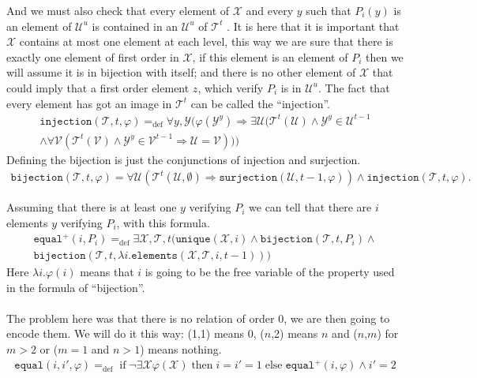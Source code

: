 \documentclass[a4paper,12pt]{article}
\theoremstyle{definition}
\renewcommand{\phi}{\varphi}
\DeclareMathOperator{\ifte}{if}
\DeclareMathOperator{\thent}{then}
\DeclareMathOperator{\elset}{else}
\newcommand{\mc}{\mathcal}
\newcommand{\ed}{=_{\mathrm{def}}}
\begin{document}
And we must also check that every element of $\mc X$ and every $y$
such that $P_i(y)$ is an element of $\mc U^u$ is contained in an $\mc
U^u$ of $\mc T^t$ . It is here that it is important that $\mc X$
contains at most one element at each level, this way we are sure that
there is exactly one element of first order in $\mc X$, if this
element is an element of $P_i$ then we will assume it is in bijection
with itself; and there is no other element of $\mc X$ that could imply
that a first order element $z$, which verify $P_i$ is in $\mc
U^{u}$. The fact that every element has got an image in $\mc T^{t}$
can be called the ``injection''.
\begin{eqnarray}
  \label{eq:relat-total}
  \texttt{injection}(\mc T,t,\phi)\ed \forall y,\mc Y(\phi(\mc Y^y)\Rightarrow\exists \mc U(\mc T^t(\mc U)\land\mc Y^{y}\in \mc U^{t-1}\nonumber \\ \land \forall \mc V(\mc T^t(\mc V)\land \mc Y^{y}\in  \mc V^{t-1}\Rightarrow \mc{U=V})))
\end{eqnarray}
Defining the bijection is just the conjunctions of injection and
surjection.
\begin{eqnarray*}
  \label{eq:bij}
  \texttt{bijection}(\mc T,t,\phi)=\forall \mc U(\mc T^{t}(\mc U,\emptyset)\Rightarrow \texttt{surjection}(\mc U,t-1,\phi))\land\texttt{injection}(\mc T,t,\phi).
\end{eqnarray*}

Assuming that there is at least one $y$ verifying $P_i$ we can tell
that there are $i$ elements $y$ verifying $P_i$, with this formula.
\begin{eqnarray}
  \label{eq:equal+}
  \texttt{equal}^+(i,P_i)\ed \exists \mc{X,T},t(\texttt{unique}(\mc X,i)\land\texttt{bijection}(\mc T,t,P_i)\land\nonumber\\
  \texttt{bijection}(\mc T,t,\lambda i.\texttt{elements}(\mc X,\mc T,i,t-1)))
\end{eqnarray}
Here $\lambda i.\phi(i)$ means that $i$ is going to be the free
variable of the property used in the formula of ``bijection''.

\paragraph{}The problem here was that there is no relation of order 0,
we are then going to encode them. We will do it this way: (1,1) means
0, ($n$,2) means $n$ and ($n$,$m$) for $m>2$ or ($m=1$ and $n>1$)
means nothing.
\begin{eqnarray*}
  \label{eq:equal}
  \texttt{equal}(i,i',\phi)\ed\ifte \neg\exists \mc X \phi(\mc X)\thent i=i'=1 \elset \texttt{equal}^+(i,\phi)\land i'=2
\end{eqnarray*}
\end{document}
